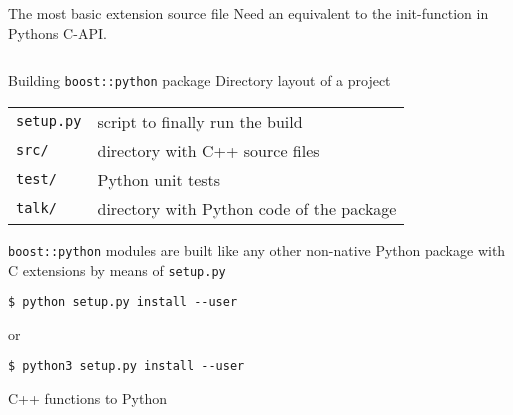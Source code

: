 
\begin{frame}[fragile]{The most basic extension source file}
Need an equivalent to the init-function in Pythons C-API.

\inputminted[fontsize=\tiny,linenos,
             firstline=20,
             lastline=42]{cpp}{../src/python-talk/src/functions.cpp}

\end{frame}

\begin{frame}[fragile]{Building \texttt{boost::python} package}
    Directory layout of a project
    \begin{center}
        \begin{tabular}{ll}
            \texttt{setup.py} & script to finally run the build \\
            \texttt{src/}     & directory with C++ source files \\
            \texttt{test/}    & Python unit tests \\
            \texttt{talk/}    & directory with Python code of the package \\
        \end{tabular}
    \end{center}
    \vspace{0.05\textheight}
    \texttt{boost::python} modules are built like any other non-native 
    Python package with C extensions by means of \texttt{setup.py}
    \vspace{0.05\textheight}
    \begin{verbatim}
$ python setup.py install --user 
    \end{verbatim}
    or 
    \begin{verbatim}
$ python3 setup.py install --user
    \end{verbatim}
\end{frame}


\begin{frame}[fragile]{C++ functions to Python}
\end{frame}

